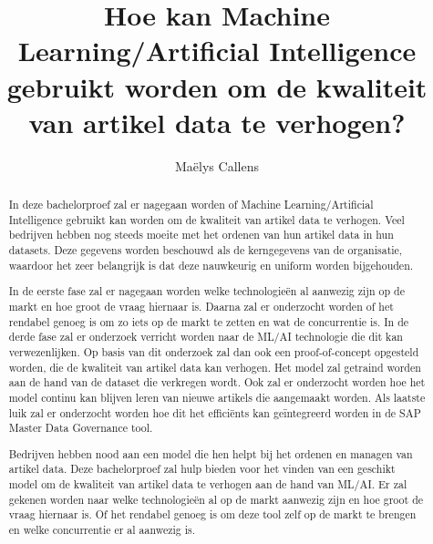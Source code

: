 \documentclass{hogent-article}
\title{Hoe kan Machine Learning/Artificial Intelligence gebruikt worden om de kwaliteit van artikel data te verhogen?}
\author{Maëlys Callens}
\begin{document}
\begin{abstract}
  In deze bachelorproef zal er nagegaan worden of Machine Learning/Artificial Intelligence gebruikt kan worden om de kwaliteit van artikel data te verhogen. Veel bedrijven hebben nog steeds moeite met het ordenen van hun artikel data in hun datasets. Deze gegevens worden beschouwd als de kerngegevens van de organisatie, waardoor het zeer belangrijk is dat deze nauwkeurig en uniform worden bijgehouden. 
  \newline

  In de eerste fase zal er nagegaan worden welke technologieën al aanwezig zijn op de markt en hoe groot de vraag hiernaar is. Daarna zal er onderzocht worden of het rendabel genoeg is om zo iets op de markt te zetten en wat de concurrentie is. In de derde fase zal er onderzoek verricht worden naar de ML/AI technologie die dit kan verwezenlijken. Op basis van dit onderzoek zal dan ook een proof-of-concept opgesteld worden, die de kwaliteit van artikel data kan verhogen. Het model zal getraind worden aan de hand van de dataset die verkregen wordt. Ook zal er onderzocht worden hoe het model continu kan blijven leren van nieuwe artikels die aangemaakt worden. Als laatste luik zal er onderzocht worden hoe dit het efficiënts kan geïntegreerd worden in de SAP Master Data Governance tool.
  \newline

  Bedrijven hebben nood aan een model die hen helpt bij het ordenen en managen van artikel data. Deze bachelorproef zal hulp bieden voor het vinden van een geschikt model om de kwaliteit van artikel data te verhogen aan de hand van ML/AI. Er zal gekenen worden naar welke technologieën al op de markt aanwezig zijn en hoe groot de vraag hiernaar is. Of het rendabel genoeg is om deze tool zelf op de markt te brengen en welke concurrentie er al aanwezig is.
\end{abstract}

\tableofcontents



\printbibliography[heading=bibintoc]
\end{document}
